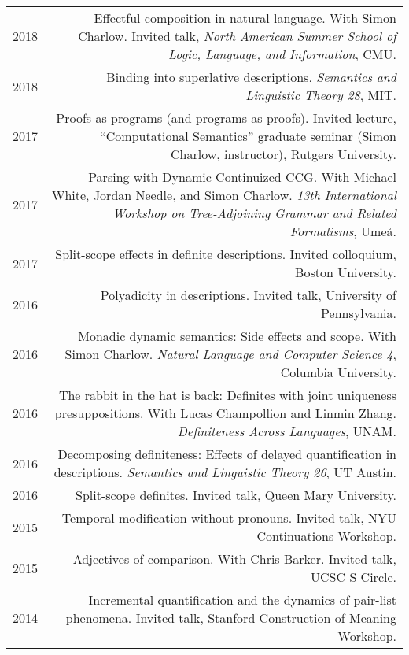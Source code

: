 \documentclass[12pt]{article}
\begin{document}
\begin{longtable}{LR}
  2018 & Effectful composition in natural language.
         With Simon Charlow.
         Invited talk, \textit{North American Summer School of Logic, Language,
         and Information}, CMU.\\
  2018 & Binding into superlative descriptions.
         \textit{Semantics and Linguistic Theory 28}, MIT.\\
  2017 & Proofs as programs (and programs as proofs).
         Invited lecture, ``Computational Semantics''
         graduate seminar (Simon Charlow, instructor), Rutgers University.\\
  2017 & Parsing with Dynamic Continuized CCG.
         With Michael White, Jordan Needle, and Simon Charlow.
         \textit{13th International Workshop on Tree-Adjoining Grammar and
         Related Formalisms}, Ume\aa.\\
  2017 & Split-scope effects in definite descriptions.
         Invited colloquium, Boston University.\\
  2016 & Polyadicity in descriptions.
         Invited talk, University of Pennsylvania.\\
  2016 & Monadic dynamic semantics: Side effects and scope.
         With Simon Charlow.
         \textit{Natural Language and Computer Science 4}, Columbia University.\\
  2016 & The rabbit in the hat is back: Definites with joint uniqueness
         presuppositions.
         With Lucas Champollion and Linmin Zhang.
         \textit{Definiteness Across Languages}, UNAM.\\
  2016 & Decomposing definiteness: Effects of delayed quantification in
         descriptions.
         \textit{Semantics and Linguistic Theory 26}, UT Austin.\\
  2016 & Split-scope definites.
         Invited talk, Queen Mary University.\\
  2015 & Temporal modification without pronouns.
         Invited talk, NYU Continuations Workshop.\\
  2015 & Adjectives of comparison.
         With Chris Barker.
         Invited talk, UCSC S-Circle.\\
  2014 & Incremental quantification and the dynamics of pair-list phenomena.
         Invited talk, Stanford Construction of Meaning Workshop.\\

\end{longtable}
\end{document}
